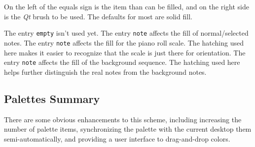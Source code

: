   On the left of the equals sign is the item than can be filled, and on the
   right side is the \textsl{Qt} brush to be used.  The defaults for most are
   solid fill.

   The entry \texttt{empty} isn't used yet.
   The entry \texttt{note} affects the fill of normal/selected notes.
   The entry \texttt{note} affects the fill for the piano roll scale.  The
   hatching used here makes it easier to recognize that the scale is just there
   for orientation.
   The entry \texttt{note} affects the fill of the background sequence.  The
   hatching used here helps further distinguish the real notes from the
   background notes.

\subsection{Palettes Summary}
\label{subsec:palettes_summary}

   There are some obvious enhancements to this scheme, including increasing the
   number of palette items, synchronizing the palette with the current desktop
   them semi-automatically, and providing a user interface to drag-and-drop
   colors.

